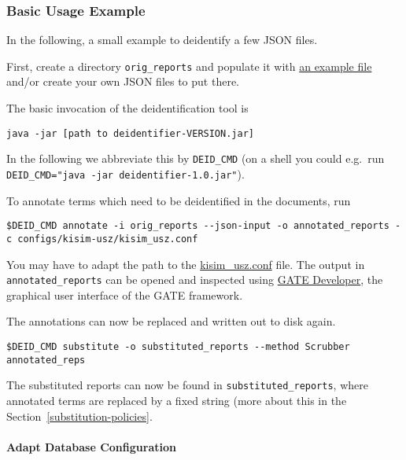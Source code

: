 \subsubsection{Basic Usage Example}\label{basic-usage-example}

In the following, a small example to deidentify a few JSON files.

First, create a directory \texttt{orig\_reports} and populate it with
\href{https://github.com/ratschlab/medical-reports-deidentification/blob/main/deidentifier-pipeline/src/test/resources/kisim_simple_example.json}{an
example file} and/or create your own JSON files to put there.

The basic invocation of the deidentification tool is

\begin{verbatim}
java -jar [path to deidentifier-VERSION.jar]
\end{verbatim}

In the following we abbreviate this by \texttt{DEID\_CMD} (on a shell
you could e.g.~run
\texttt{DEID\_CMD="java\ -jar\ deidentifier-1.0.jar"}).

To annotate terms which need to be deidentified in the documents, run

\begin{verbatim}
$DEID_CMD annotate -i orig_reports --json-input -o annotated_reports -c configs/kisim-usz/kisim_usz.conf
\end{verbatim}

You may have to adapt the path to the
\href{https://github.com/ratschlab/medical-reports-deidentification/blob/main/configs/kisim-usz/kisim_usz.conf}{kisim\_usz.conf} file. The
output in \texttt{annotated\_reports} can be opened and inspected using
\href{https://gate.ac.uk/download/}{GATE Developer}, the graphical user
interface of the GATE framework.

The annotations can now be replaced and written out to disk again.

\begin{verbatim}
$DEID_CMD substitute -o substituted_reports --method Scrubber annotated_reps
\end{verbatim}

The substituted reports can now be found in
\texttt{substituted\_reports}, where annotated terms are replaced by a
fixed string (more about this in the Section~\ref{substitution-policies}.

\paragraph{Adapt Database
Configuration}\label{adapt-database-configuration}

